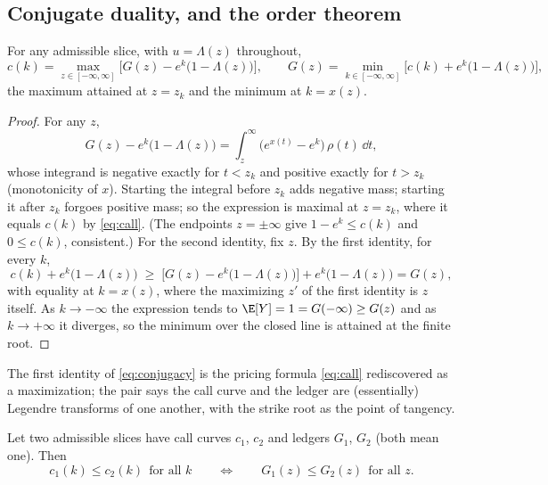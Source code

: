 \subsection{Conjugate duality, and the order theorem}

\begin{lemma}
\label{lem:conjugacy}
For any admissible slice, with $u=\Lambda(z)$ throughout,
\begin{equation}
c(k)=\max_{z\in[-\infty,\infty]}\Big[G(z)-e^{k}\big(1-\Lambda(z)\big)\Big],
\qquad
G(z)=\min_{k\in[-\infty,\infty]}\Big[c(k)+e^{k}\big(1-\Lambda(z)\big)\Big],
\label{eq:conjugacy}
\end{equation}
the maximum attained at $z=z_k$ and the minimum at $k=x(z)$.
\end{lemma}

\begin{proof}
For any $z$,
\[
G(z)-e^{k}\big(1-\Lambda(z)\big)
=\int_z^{\infty}\big(e^{x(t)}-e^{k}\big)\,\rho(t)\,\dd t ,
\]
whose integrand is negative exactly for $t<z_k$ and positive exactly for
$t>z_k$ (monotonicity of $x$).  Starting the integral before $z_k$ adds
negative mass; starting it after $z_k$ forgoes positive mass; so the
expression is maximal at $z=z_k$, where it equals $c(k)$ by
\eqref{eq:call}.  (The endpoints $z=\pm\infty$ give $1-e^{k}\le c(k)$ and
$0\le c(k)$, consistent.)  For the second identity, fix $z$.  By the
first identity, for every $k$,
\[
c(k)+e^{k}\big(1-\Lambda(z)\big)
\;\ge\;\Big[G(z)-e^{k}\big(1-\Lambda(z)\big)\Big]
+e^{k}\big(1-\Lambda(z)\big)=G(z),
\]
with equality at $k=x(z)$, where the maximizing $z'$ of the first
identity is $z$ itself.  As $k\to-\infty$ the expression tends to
$\E[Y]=1=G(-\infty)\ge G(z)$ and as $k\to+\infty$ it diverges, so the
minimum over the closed line is attained at the finite root.
\end{proof}

The first identity of \eqref{eq:conjugacy} is the pricing formula
\eqref{eq:call} rediscovered as a maximization; the pair says the call
curve and the ledger are (essentially) Legendre transforms of one
another, with the strike root as the point of tangency.

\begin{theorem}
\label{thm:ledgerorder}
Let two admissible slices have call curves $c_1$, $c_2$ and ledgers
$G_1$, $G_2$ (both mean one).  Then
\[
c_1(k)\le c_2(k)\ \ \text{for all }k
\qquad\Longleftrightarrow\qquad
G_1(z)\le G_2(z)\ \ \text{for all }z .
\]
\end{theorem}

